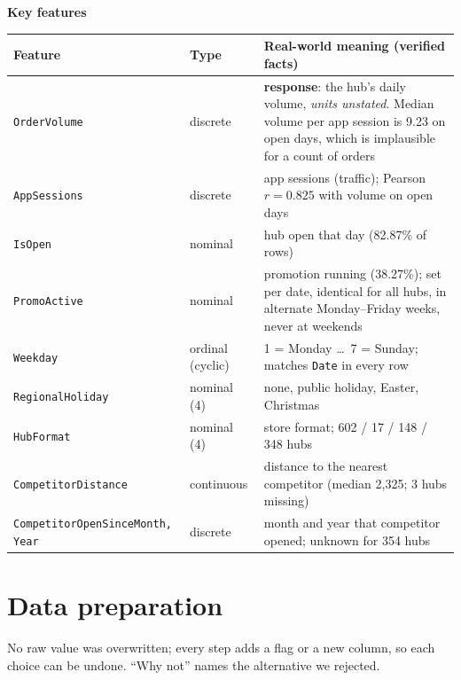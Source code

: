 \documentclass[10pt,a4paper,twocolumn]{article}
\newcommand{\key}[1]{\textbf{\textcolor{keyblue}{#1}}}
\newcommand{\minihead}[1]{\par\needspace{8\baselineskip}\smallskip\key{#1}\par}
\newcommand{\code}[1]{\texttt{#1}}
\begin{document}
\minihead{Key features}
{\footnotesize
\begin{tabularx}{\linewidth}{@{}L{3.25cm} L{1.35cm} Y@{}}
\toprule
\textbf{Feature} & \textbf{Type} & \textbf{Real-world meaning (verified facts)} \\
\midrule
\code{OrderVolume} & discrete & \key{response}: the hub's daily volume, \emph{units unstated}. Median volume per app
  session is 9.23 on open days, which is implausible for a count of orders \\
\code{AppSessions} & discrete & app sessions (traffic); Pearson $r=0.825$ with volume on open days \\
\code{IsOpen} & nominal & hub open that day (82.87\% of rows) \\
\code{PromoActive} & nominal & promotion running (38.27\%); set per date, identical for all hubs, in alternate
  Monday--Friday weeks, never at weekends \\
\code{Weekday} & ordinal (cyclic) & 1 = Monday \dots\ 7 = Sunday; matches \code{Date} in every row \\
\code{RegionalHoliday} & nominal (4) & none, public holiday, Easter, Christmas \\
\code{HubFormat} & nominal (4) & store format; 602 / 17 / 148 / 348 hubs \\
\code{CompetitorDistance} & continuous & distance to the nearest competitor (median 2{,}325; 3 hubs missing) \\
\code{CompetitorOpenSince}\newline\code{Month, Year} & discrete & month and year that competitor opened; unknown for 354 hubs \\
\bottomrule
\end{tabularx}}

\section{Data preparation}

No raw value was overwritten; every step adds a flag or a new column, so each choice can be undone.
``Why not'' names the alternative we rejected.
\end{document}
